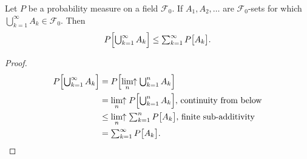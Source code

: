 \begin{theorem}
Let $P$ be a probability measure on a field $\mathcal F_0$. If $A_1, A_2, \ldots$ are $\mathcal F_0$-sets for which $\bigcup_{k=1}^\infty A_k\in \mathcal F_0$. Then
\[ P\Bigl[\textstyle\bigcup_{k=1}^\infty A_k \Bigr]\leq \sum_{k=1}^\infty P\bigl[A_k \bigr]. \]
\end{theorem}
\begin{proof}
\begin{align*}
 P\Bigl[\textstyle\bigcup_{k=1}^\infty A_k \Bigr]
 & =  P\Bigl[\displaystyle\lim_{n}\!\!\uparrow\textstyle\bigcup_{k=1}^n A_k \Bigr] \\
 & =  \displaystyle\lim_{n}\!\!\uparrow P\Bigl[\textstyle\bigcup_{k=1}^n A_k \Bigr],\,\text{continuity from below}\\
 & \leq  \displaystyle\lim_{n}\!\!\uparrow \textstyle\sum_{k=1}^n P\bigl[A_k \bigr],\,\text{finite sub-additivity}\\
 & =  \textstyle\sum_{k=1}^\infty P\bigl[A_k \bigr].
\end{align*}
\end{proof}


